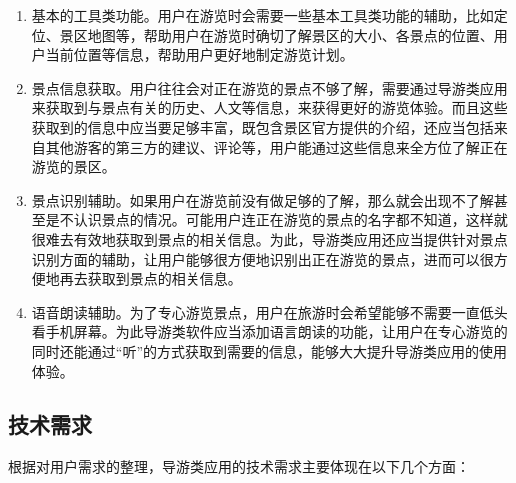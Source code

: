 			\begin{enumerate}
				
				\item 基本的工具类功能。用户在游览时会需要一些基本工具类功能的辅助，比如定位、景区地图等，帮助用户在游览时确切了解景区的大小、各景点的位置、用户当前位置等信息，帮助用户更好地制定游览计划。

				\item 景点信息获取。用户往往会对正在游览的景点不够了解，需要通过导游类应用来获取到与景点有关的历史、人文等信息，来获得更好的游览体验。而且这些获取到的信息中应当要足够丰富，既包含景区官方提供的介绍，还应当包括来自其他游客的第三方的建议、评论等，用户能通过这些信息来全方位了解正在游览的景区。

				\item 景点识别辅助。如果用户在游览前没有做足够的了解，那么就会出现不了解甚至是不认识景点的情况。可能用户连正在游览的景点的名字都不知道，这样就很难去有效地获取到景点的相关信息。为此，导游类应用还应当提供针对景点识别方面的辅助，让用户能够很方便地识别出正在游览的景点，进而可以很方便地再去获取到景点的相关信息。

				\item 语音朗读辅助。为了专心游览景点，用户在旅游时会希望能够不需要一直低头看手机屏幕。为此导游类软件应当添加语言朗读的功能，让用户在专心游览的同时还能通过“听”的方式获取到需要的信息，能够大大提升导游类应用的使用体验。

			\end{enumerate}

		\subsection{技术需求}

			根据对用户需求的整理，导游类应用的技术需求主要体现在以下几个方面：

